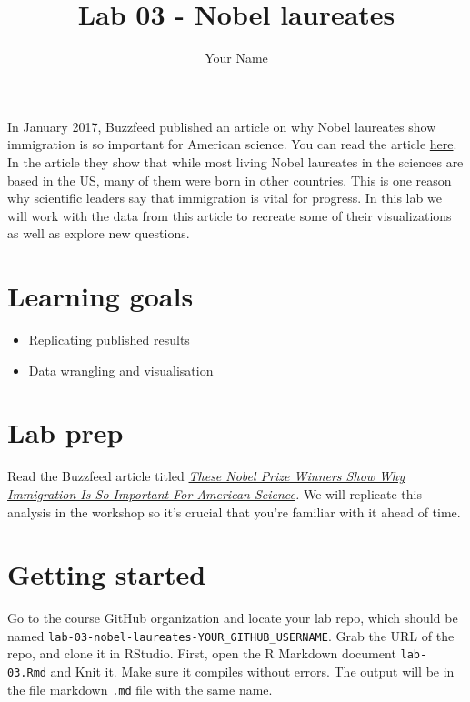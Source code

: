 \documentclass[
]{article}
\title{Lab 03 - Nobel laureates}
\author{Your Name}
\date{}
\providecommand{\tightlist}{%
  \setlength{\itemsep}{0pt}\setlength{\parskip}{0pt}}
\begin{document}
\maketitle

{
\setcounter{tocdepth}{2}
\tableofcontents
}
In January 2017, Buzzfeed published an article on why Nobel laureates
show immigration is so important for American science. You can read the
article
\href{https://www.buzzfeednews.com/article/peteraldhous/immigration-and-science}{here}.
In the article they show that while most living Nobel laureates in the
sciences are based in the US, many of them were born in other countries.
This is one reason why scientific leaders say that immigration is vital
for progress. In this lab we will work with the data from this article
to recreate some of their visualizations as well as explore new
questions.

\section{Learning goals}\label{learning-goals}

\begin{itemize}
\tightlist
\item
  Replicating published results
\item
  Data wrangling and visualisation
\end{itemize}

\section{Lab prep}\label{lab-prep}

Read the Buzzfeed article titled
\href{https://www.buzzfeednews.com/article/peteraldhous/immigration-and-science}{\emph{These
Nobel Prize Winners Show Why Immigration Is So Important For American
Science}}\emph{.} We will replicate this analysis in the workshop so
it's crucial that you're familiar with it ahead of time.

\section{Getting started}\label{getting-started}

Go to the course GitHub organization and locate your lab repo, which
should be named \texttt{lab-03-nobel-laureates-YOUR\_GITHUB\_USERNAME}.
Grab the URL of the repo, and clone it in RStudio. First, open the R
Markdown document \texttt{lab-03.Rmd} and Knit it. Make sure it compiles
without errors. The output will be in the file markdown \texttt{.md}
file with the same name.
\end{document}
